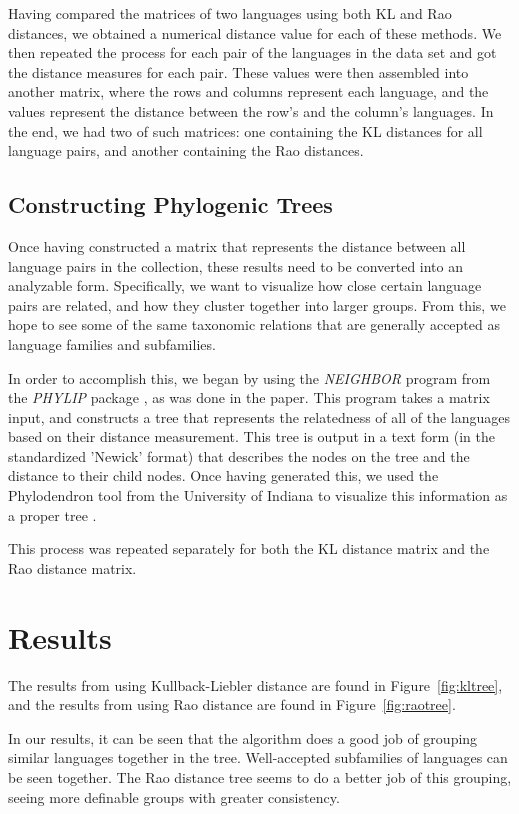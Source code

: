 \documentclass[10pt,a4]{article}
\begin{document}
Having compared the matrices of two languages using both KL and Rao distances, we obtained a numerical distance value for each of these methods. We then repeated the process for each pair of the languages in the data set and got the distance measures for each pair. These values were then assembled into another matrix, where the rows and columns represent each language, and the values represent the distance between the row's and the column's languages. In the end, we had two of such matrices: one containing the KL distances for all language pairs, and another containing the Rao distances.

\subsection{Constructing Phylogenic Trees}

Once having constructed a matrix that represents the distance between all language pairs in the collection, these results need to be converted into an analyzable form.  Specifically, we want to visualize how close certain language pairs are related, and how they cluster together into larger groups.  From this, we hope to see some of the same taxonomic relations that are generally accepted as language families and subfamilies.

In order to accomplish this, we began by using the \textit{NEIGHBOR} program from the \textit{PHYLIP} package \cite{web:phylip}, as was done in the paper.  This program takes a matrix input, and constructs a tree that represents the relatedness of all of the languages based on their distance measurement.  This tree is output in a text form (in the standardized 'Newick' format) that describes the nodes on the tree and the distance to their child nodes.  Once having generated this, we used the Phylodendron tool from the University of Indiana to visualize this information as a proper tree \cite{web:phylodendron}.  

This process was repeated separately for both the KL distance matrix and the Rao distance matrix.

\section{Results}
	
The results from using Kullback-Liebler distance are found in Figure~\ref{fig:kltree}, and the results from using Rao distance are found in Figure~\ref{fig:raotree}.

In our results, it can be seen that the algorithm does a good job of grouping similar languages together in the tree.  Well-accepted subfamilies of languages can be seen together.  The Rao distance tree seems to do a better job of this grouping, seeing more definable groups with greater consistency.
\end{document}

